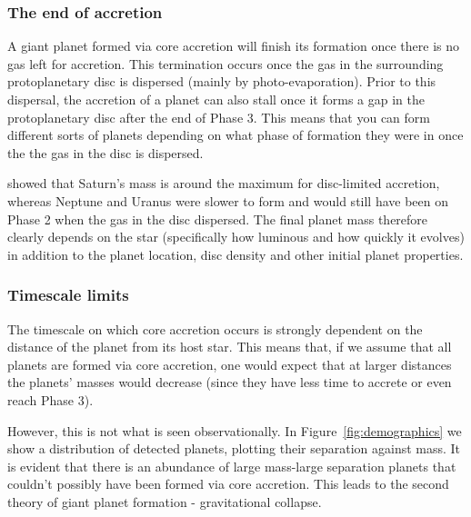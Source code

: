 \documentclass[twocolumn]{aastex631}
\begin{document}
\subsubsection{The end of accretion}

A giant planet formed via core accretion will finish its formation once there is no gas left for accretion. This termination occurs once the gas in the surrounding protoplanetary disc is dispersed (mainly by photo-evaporation). Prior to this dispersal, the accretion of a planet can also stall once it forms a gap in the protoplanetary disc after the end of Phase 3. This means that you can form different sorts of planets depending on what phase of formation they were in once the the gas in the disc is dispersed.

\citet{Lissauer+2009} showed that Saturn's mass is around the maximum for disc-limited accretion, whereas Neptune and Uranus were slower to form and would still have been on Phase 2 when the gas in the disc dispersed. The final planet mass therefore clearly depends on the star (specifically how luminous and how quickly it evolves) in addition to the planet location, disc density and other initial planet properties.

\subsubsection{Timescale limits}

The timescale on which core accretion occurs is strongly dependent on the distance of the planet from its host star. This means that, if we assume that all planets are formed via core accretion, one would expect that at larger distances the planets' masses would decrease (since they have less time to accrete or even reach Phase 3).

However, this is not what is seen observationally. In Figure~\ref{fig:demographics} we show a distribution of detected planets, plotting their separation against mass. It is evident that there is an abundance of large mass-large separation planets that couldn't possibly have been formed via core accretion. This leads to the second theory of giant planet formation - gravitational collapse.
\end{document}

